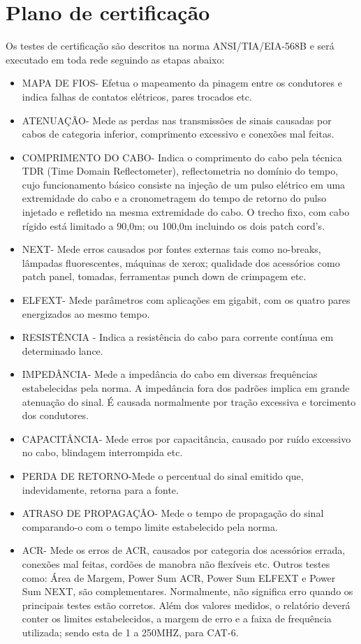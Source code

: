 \documentclass[	DIV=calc,%
							paper=a4,%
							fontsize=12pt,%
							onecolumn]{scrartcl}	 					%
\begin{document}
\section{Plano de certificação}
Os testes de certificação são descritos na norma ANSI/TIA/EIA-568B e será executado em toda rede seguindo as etapas abaixo:
\begin{itemize}
		
		\item MAPA DE FIOS- Efetua o mapeamento da pinagem entre os condutores e indica falhas de
		contatos elétricos, pares trocados etc.
		\item ATENUAÇÃO- Mede as perdas nas transmissões de sinais causadas por cabos de categoria
		inferior, comprimento excessivo e conexões mal feitas.
		\item COMPRIMENTO DO CABO- Indica o comprimento do cabo pela técnica TDR (Time Domain
		Reflectometer), reflectometria no domínio do tempo, cujo funcionamento básico consiste na injeção
		de um pulso elétrico em uma extremidade do cabo e a cronometragem do tempo de retorno do
		pulso injetado e refletido na mesma extremidade do cabo. O trecho fixo, com cabo rígido está
		limitado a 90,0m; ou 100,0m incluindo os dois patch cord's.
		\item NEXT- Mede erros causados por fontes externas tais como no-breaks, lâmpadas fluorescentes,
		máquinas de xerox; qualidade dos acessórios como patch panel, tomadas, ferramentas punch
		down de crimpagem etc.
		\item ELFEXT- Mede parâmetros com aplicações em gigabit, com os quatro pares energizados ao
		mesmo tempo.
		\item RESISTÊNCIA - Indica a resistência do cabo para corrente contínua em determinado lance.
		\item IMPEDÂNCIA- Mede a impedância do cabo em diversas frequências estabelecidas pela norma. A
		impedância fora dos padrões implica em grande atenuação do sinal. É causada normalmente por
		tração excessiva e torcimento dos condutores.
		\item CAPACITÂNCIA- Mede erros por capacitância, causado por ruído excessivo no cabo, blindagem
		interrompida etc.
		\item PERDA DE RETORNO-Mede o percentual do sinal emitido que, indevidamente, retorna para a
		fonte.
		\item ATRASO DE PROPAGAÇÃO- Mede o tempo de propagação do sinal comparando-o com o tempo
		limite estabelecido pela norma.
		\item ACR- Mede os erros de ACR, causados por categoria dos acessórios errada, conexões mal feitas,
		cordões de manobra não flexíveis etc.
		Outros testes como: Área de Margem, Power Sum ACR, Power Sum ELFEXT e Power Sum NEXT,
		são complementares. Normalmente, não significa erro quando os principais testes estão corretos.
		Além dos valores medidos, o relatório deverá conter os limites estabelecidos, a margem de erro e a
		faixa de frequência utilizada; sendo esta de 1 a 250MHZ, para CAT-6.	 
\end{itemize} 
\end{document}
